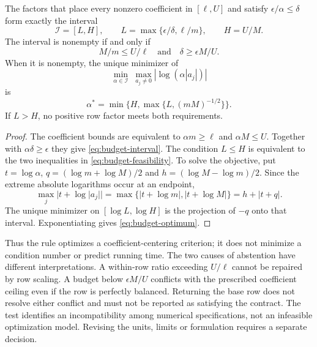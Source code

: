 \begin{proposition}
\label{prop:budget}
The factors that place every nonzero coefficient in $[\ell,U]$ and satisfy
$\epsilon/\alpha\le\delta$ form exactly the interval
\begin{equation}\label{eq:budget-interval}
 \mathcal I=[L,H],\qquad
 L=\max\{\epsilon/\delta,\ell/m\},\qquad H=U/M.
\end{equation}
The interval is nonempty if and only if
\begin{equation}\label{eq:budget-feasibility}
 M/m\le U/\ell\quad\text{and}\quad \delta\ge\epsilon M/U.
\end{equation}
When it is nonempty, the unique minimizer of
\begin{equation}\label{eq:budget-objective}
 \min_{\alpha\in\mathcal I}\;\max_{a_j\ne0}|\log(\alpha|a_j|)|
\end{equation}
is
\begin{equation}\label{eq:budget-optimum}
 \alpha^*=\min\{H,\max\{L,(mM)^{-1/2}\}\}.
\end{equation}
If $L>H$, no positive row factor meets both requirements.
\end{proposition}

\begin{proof}
The coefficient bounds are equivalent to $\alpha m\ge\ell$ and $\alpha M\le U$.
Together with $\alpha\delta\ge\epsilon$ they give \eqref{eq:budget-interval}.
The condition $L\le H$ is equivalent to the two inequalities in
\eqref{eq:budget-feasibility}. To solve the objective, put $t=\log\alpha$,
$q=(\log m+\log M)/2$ and $h=(\log M-\log m)/2$. Since the extreme absolute
logarithms occur at an endpoint,
\[
 \max_j|t+\log|a_j||=\max\{|t+\log m|,|t+\log M|\}=h+|t+q|.
\]
The unique minimizer on $[\log L,\log H]$ is the projection of $-q$ onto that
interval. Exponentiating gives \eqref{eq:budget-optimum}.
\end{proof}

Thus the rule optimizes a coefficient-centering criterion; it does not minimize a
condition number or predict running time. The two causes of abstention have different
interpretations. A within-row ratio exceeding $U/\ell$ cannot be repaired by row
scaling. A budget below $\epsilon M/U$ conflicts with the prescribed coefficient
ceiling even if the row is perfectly balanced. Returning the base row does not
resolve either conflict and must not be reported as satisfying the contract.
The test identifies an incompatibility among numerical specifications, not an
infeasible optimization model. Revising the units, limits or formulation requires a
separate decision.

